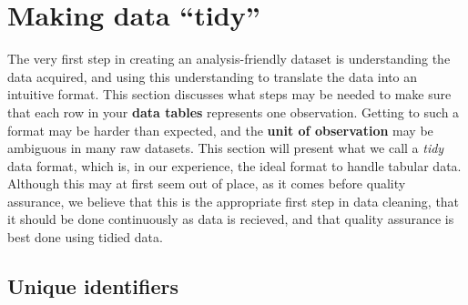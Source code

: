 \section{Making data ``tidy''}

The very first step in creating an analysis-friendly dataset
is understanding the data acquired,
and using this understanding to translate the data into an intuitive format.
This section discusses what steps may be needed to make sure that each row
in your \textbf{data tables}
represents one observation.
Getting to such a format may be harder than expected,
and the \textbf{unit of observation}
 may be ambiguous in many raw datasets.
This section will present what we call a \textit{tidy} data format,
which is, in our experience, the ideal format to handle tabular data.
Although this may at first seem out of place, as it comes before quality assurance,
we believe that this is the appropriate first step in data cleaning,
that it should be done continuously as data is recieved,
and that quality assurance is best done using tidied data.

\subsection{Unique identifiers}

